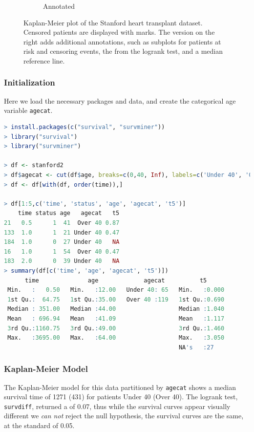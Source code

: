 \begin{figure}[H]
\begin{subfigure}[c]{0.48\textwidth}
  \caption{Annotated}
  \label{fig:stanford_km:annotated}
  \end{subfigure}
\caption{
Kaplan-Meier plot of the Stanford heart transplant dataset. Censored patients are displayed with marks.
The version on the right adds additional annotations, such as
subplots for patients at risk and censoring events,
the \pvalue from the logrank test, and a median reference line.
}
\label{fig:stanford_km}
\end{figure}

\subsubsection{Initialization}
\label{survival:Rcode:init}

Here we load the necessary packages and data,
and create the categorical age variable \texttt{agecat}.

\begin{lstlisting}[language=R]
> install.packages(c("survival", "survminer"))
> library("survival")
> library("survminer")

> df <- stanford2
> df$agecat <- cut(df$age, breaks=c(0,40, Inf), labels=c('Under 40', 'Over 40'), right=FALSE)
> df <- df[with(df, order(time)),]

> df[1:5,c('time', 'status', 'age', 'agecat', 't5')]
    time status age   agecat   t5
21   0.5      1  41  Over 40 0.87
133  1.0      1  21 Under 40 0.47
184  1.0      0  27 Under 40   NA
16   1.0      1  54  Over 40 0.47
183  2.0      0  39 Under 40   NA
> summary(df[c('time', 'age', 'agecat', 't5')])
      time              age             agecat          t5
 Min.   :   0.50   Min.   :12.00   Under 40: 65   Min.   :0.000
 1st Qu.:  64.75   1st Qu.:35.00   Over 40 :119   1st Qu.:0.690
 Median : 351.00   Median :44.00                  Median :1.040
 Mean   : 696.94   Mean   :41.09                  Mean   :1.117
 3rd Qu.:1160.75   3rd Qu.:49.00                  3rd Qu.:1.460
 Max.   :3695.00   Max.   :64.00                  Max.   :3.050
                                                  NA's   :27
\end{lstlisting}

\subsubsection{Kaplan-Meier Model}
\label{survival:Rcode:km}

The Kaplan-Meier model for this data partitioned by \texttt{agecat}
shows a median survival time of \num{1271} (\num{431}) for patients Under 40 (Over 40).
The logrank test, \texttt{survdiff}, returned a \pvalue of \num{0.07},
thus while the survival curves appear visually different we {\em can not} reject the null hypothesis,
the survival curves are the same, at the standard \pvalue of \num{0.05}.

